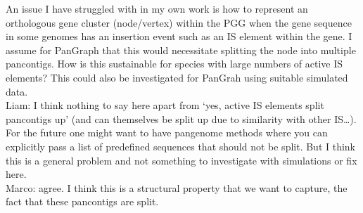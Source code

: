 \documentclass[aps,rmp,onecolumn]{revtex4-1}
\newcommand{\Marco}[1]{{\color{gray}Marco: #1}}
\newcommand{\Liam}[1]{{\color{teal}Liam: #1}}
\begin{document}
An issue I have struggled with in my own work is how to represent an orthologous gene cluster (node/vertex) within the PGG when the gene sequence in some genomes has an insertion event such as an IS element within the gene. I assume for PanGraph that this would necessitate splitting the node into multiple pancontigs. How is this sustainable for species with large numbers of active IS elements? This could also be investigated for PanGrah using suitable simulated data.\\
\Liam{I think nothing to say here apart from `yes, active IS elements split pancontigs up' (and can themselves be split up due to similarity with other IS\ldots). For the future one might want to have pangenome methods where you can explicitly pass a list of predefined sequences that should not be split. But I think this is a general problem and not something to investigate with simulations or fix here.}\\
\Marco{agree. I think this is a structural property that we want to capture, the fact that these pancontigs are split.}


{}
\end{document}

